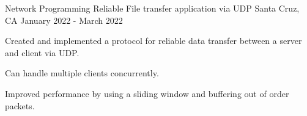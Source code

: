 \begin{cventries}
  \cventry
    {Network Programming}
    {Reliable File transfer application via UDP}
    {Santa Cruz, CA}
    {January 2022 - March 2022}
    {
        \begin{cvitems}
            \item {Created and implemented a protocol for reliable data transfer between a server and client via UDP.}
            \item {Can handle multiple clients concurrently.}
            \item {Improved performance by using a sliding window and buffering out of order packets.}        \end{cvitems}
    }

\end{cventries}